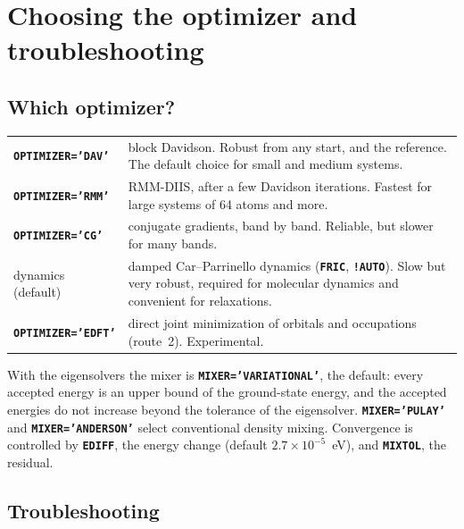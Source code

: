 \documentclass[11pt,a4paper,oneside]{book}
\newcommand{\key}[1]{\textbf{\texttt{#1}}}
\begin{document}
\chapter{Choosing the optimizer and troubleshooting}
\minitoc

\section{Which optimizer?}

\begin{center}
\begin{tabular}{p{3.2cm}p{10.6cm}}\toprule
\key{OPTIMIZER='DAV'} & block Davidson. Robust from any start, and the
  reference. The default choice for small and medium systems. \\
\key{OPTIMIZER='RMM'} & RMM-DIIS, after a few Davidson iterations.
  Fastest for large systems of 64 atoms and more. \\
\key{OPTIMIZER='CG'} & conjugate gradients, band by band. Reliable,
  but slower for many bands. \\
dynamics (default) & damped Car--Parrinello dynamics (\key{FRIC},
  \key{!AUTO}). Slow but very robust, required for molecular dynamics
  and convenient for relaxations. \\
\key{OPTIMIZER='EDFT'} & direct joint minimization of orbitals and
  occupations (route~2). Experimental. \\ \bottomrule
\end{tabular}
\end{center}
With the eigensolvers the mixer is \key{MIXER='VARIATIONAL'}, the
default: every accepted energy is an upper bound of the ground-state
energy, and the accepted energies do not increase beyond the tolerance
of the eigensolver. \key{MIXER='PULAY'} and \key{MIXER='ANDERSON'}
select conventional density mixing. Convergence is controlled by
\key{EDIFF}, the energy change (default $2.7\times10^{-5}$~eV), and
\key{MIXTOL}, the residual.

\section{Troubleshooting}
\end{document}
